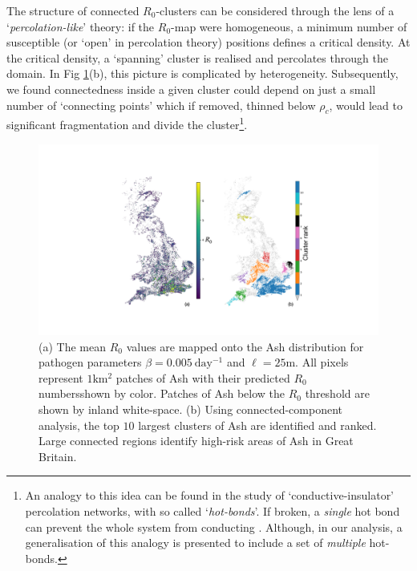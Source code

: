 The structure of connected $R_0$-clusters can be considered through the lens of a `\textit{percolation-like}' theory: if the $R_0$-map were homogeneous, a minimum number of susceptible (or `open' in percolation theory) positions defines a critical density. At the critical density, a `spanning' cluster is realised and percolates through the domain. In Fig \ref{fig:uk-mapping}(b), this picture is complicated by heterogeneity. Subsequently, we found connectedness inside a given cluster could depend on just a small number of `connecting points' which if removed, thinned below $\rho_c$, would lead to significant fragmentation and divide the cluster\footnote{An analogy to this idea can be found in the study of `conductive-insulator' percolation networks, with so called `\textit{hot-bonds}'. If broken, a \textit{single} hot bond can prevent the whole system from conducting \cite{RevModPhys.45.574, Herrmann_1984, hot-bond}. Although, in our analysis, a generalisation of this analogy is presented to include a set of \textit{multiple} hot-bonds.}.\\

\begin{figure}
\hfill
\centering
\includegraphics[scale=0.45]{chapter5/figures/figure4.pdf} 
\caption{(a) The mean $R_0$ values are mapped onto the Ash distribution for pathogen parameters $\beta = 0.005\ \mathrm{day^{-1}}$ and $\ell=25\textrm{m}$. All pixels represent $\mathrm{1km^2}$ patches of Ash with their predicted $R_0$ numbers\textemdash shown by color. Patches of Ash below the $R_0$ threshold are shown by inland white-space. (b) Using connected-component analysis, the top $10$ largest clusters of Ash are identified and ranked. Large connected regions identify high-risk areas of Ash in Great Britain.}
\label{fig:uk-mapping}
\end{figure}

